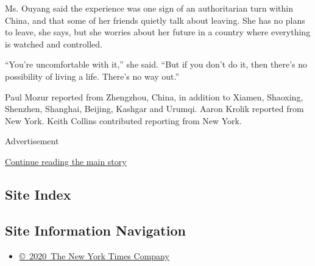 Ms. Ouyang said the experience was one sign of an authoritarian turn
within China, and that some of her friends quietly talk about leaving.
She has no plans to leave, she says, but she worries about her future in
a country where everything is watched and controlled.

``You're uncomfortable with it,'' she said. ``But if you don't do it,
then there's no possibility of living a life. There's no way out.''

Paul Mozur reported from Zhengzhou, China, in addition to Xiamen,
Shaoxing, Shenzhen, Shanghai, Beijing, Kashgar and Urumqi. Aaron Krolik
reported from New York. Keith Collins contributed reporting from New
York.

Advertisement

\protect\hyperlink{after-bottom}{Continue reading the main story}

\hypertarget{site-index}{%
\subsection{Site Index}\label{site-index}}

\hypertarget{site-information-navigation}{%
\subsection{Site Information
Navigation}\label{site-information-navigation}}

\begin{itemize}
\tightlist
\item
  \href{https://help.nytimes3xbfgragh.onion/hc/en-us/articles/115014792127-Copyright-notice}{©~2020~The
  New York Times Company}
\end{itemize}


